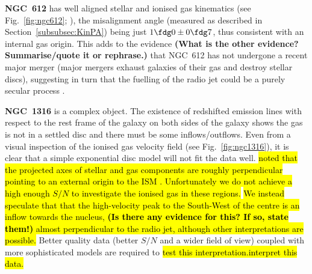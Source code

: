 \documentclass[a4paper,fleqn,usenatbib]{mnras}
\DeclareRobustCommand{\removed}[1]{{\sethlcolor{red}\hl{#1}}}
\DeclareRobustCommand{\added}[1]{{\sethlcolor{green}\hl{#1}}}
\begin{document}
\textbf{NGC~612} has well aligned stellar and ionised gas kinematics
(see Fig.~\ref{fig:ngc612}; \citealt{Goss1980}), the misalignment angle (measured as
described in Section~\ref{subsubsec:KinPA}) being just
$1\fdg0\pm0\fdg7$, thus consistent with an internal gas origin. This
adds to the evidence {\bf (What is the other evidence?
  Summarise/quote it or rephrase.)} that NGC~612 has not undergone a
recent major merger (major mergers exhaust galaxies of their gas and
destroy stellar discs), suggesting in turn that the fuelling of the
radio jet could be a purely secular process \citep{Ekers1978}.

\textbf{NGC~1316} is a complex object. The existence of redshifted
emission lines with respect to the rest frame of the galaxy on both
sides of the galaxy shows the gas is not in a settled disc and there
must be some inflows/outflows. Even from a visual inspection of the
ionised gas velocity field (see Fig.~\ref{fig:ngc1316}), it is clear
that a simple exponential disc model will not fit the data well. \added{\citet{Schweizer1980} noted that the projected axes of stellar and gas components are roughly perpendicular pointing to an external origin to the ISM \citep{Shklovskii1962}. Unfortunately we do not achieve a high enough $S/N$ to investigate the ionised gas in these regions.} \removed{We
instead speculate that that the high-velocity peak to the South-West
of the centre is an inflow towards the nucleus, {\bf (Is there any
  evidence for this? If so, state them!)} almost perpendicular to the
radio jet, although other interpretations are possible.} Better quality
data (better $S/N$ and a wider field of view) coupled with more
sophisticated models are required to \removed{test this interpretation.}\added{interpret this data.}
		
\end{document}
